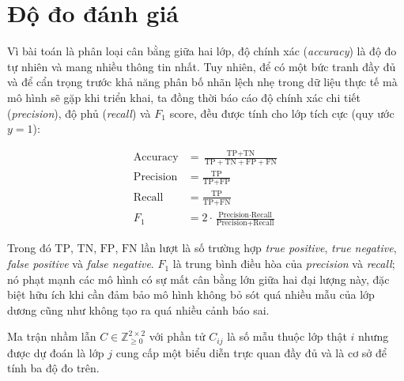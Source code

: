 \section{Độ đo đánh giá}

Vì bài toán là phân loại cân bằng giữa hai lớp, độ chính xác (\textit{accuracy}) là độ đo tự nhiên và mang nhiều thông tin nhất. Tuy nhiên, để có một bức tranh đầy đủ và để cẩn trọng trước khả năng phân bố nhãn lệch nhẹ trong dữ liệu thực tế mà mô hình sẽ gặp khi triển khai, ta đồng thời báo cáo độ chính xác chi tiết (\textit{precision}), độ phủ (\textit{recall}) và $F_1$ score, đều được tính cho lớp tích cực (quy ước $y=1$):

\begin{align}
\text{Accuracy} &= \frac{\text{TP} + \text{TN}}{\text{TP} + \text{TN} + \text{FP} + \text{FN}} \\[1ex]
\text{Precision} &= \frac{\text{TP}}{\text{TP} + \text{FP}} \\[1ex]
\text{Recall} &= \frac{\text{TP}}{\text{TP} + \text{FN}} \\[1ex]
F_1 &= 2 \cdot \frac{\text{Precision} \cdot \text{Recall}}{\text{Precision} + \text{Recall}}
\end{align}

Trong đó $\text{TP}$, $\text{TN}$, $\text{FP}$, $\text{FN}$ lần lượt là số trường hợp \textit{true positive}, \textit{true negative}, \textit{false positive} và \textit{false negative}. $F_1$ là trung bình điều hòa của \textit{precision} và \textit{recall}; nó phạt mạnh các mô hình có sự mất cân bằng lớn giữa hai đại lượng này, đặc biệt hữu ích khi cần đảm bảo mô hình không bỏ sót quá nhiều mẫu của lớp dương cũng như không tạo ra quá nhiều cảnh báo sai.

Ma trận nhầm lẫn $C \in \mathbb{Z}_{\geq 0}^{2 \times 2}$ với phần tử $C_{ij}$ là số mẫu thuộc lớp thật $i$ nhưng được dự đoán là lớp $j$ cung cấp một biểu diễn trực quan đầy đủ và là cơ sở để tính ba độ đo trên.
